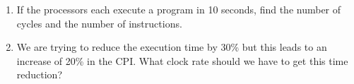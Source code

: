 \documentclass[10pt]{article}
\begin{document}
\begin{enumerate}
\begin{enumerate}
\begin{center}
        \end{center}
        
        \item If the processors each execute a program in 10 seconds, find the number of cycles and the number of instructions.
        \begin{center}
            
        \end{center}

        \item We are trying to reduce the execution time by 30\% but this leads to an increase of 20\% in the CPI. What clock rate should we have to get this time reduction?
    \end{enumerate}
    
    
\end{enumerate}
\end{document}
